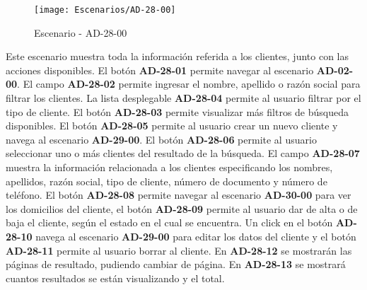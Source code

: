 \begin{figure}[H]
\centering
\texttt{[image: Escenarios/AD-28-00]}
\caption{Escenario - AD-28-00}
\label{fig:AD-28-00}
\end{figure}
Este escenario muestra toda la información referida a los clientes, junto con las acciones disponibles.
El botón \textbf{AD-28-01} permite navegar al escenario \textbf{AD-02-00}. El campo \textbf{AD-28-02} permite ingresar el nombre, apellido o razón social para filtrar los clientes. La lista desplegable \textbf{AD-28-04} permite al usuario filtrar por el tipo de cliente. El botón \textbf{AD-28-03} permite visualizar más filtros de búsqueda disponibles.
El botón \textbf{AD-28-05} permite al usuario crear un nuevo cliente y navega al escenario \textbf{AD-29-00}.
El botón \textbf{AD-28-06} permite al usuario seleccionar uno o más clientes del resultado de la búsqueda. El campo \textbf{AD-28-07} muestra la información relacionada a los clientes  especificando los nombres, apellidos, razón social, tipo de cliente, número de documento y número de teléfono. El botón \textbf{AD-28-08} permite navegar al escenario \textbf{AD-30-00} para ver los domicilios del cliente, el botón \textbf{AD-28-09} permite al usuario dar de alta o de baja el cliente, según el estado en el cual se encuentra. Un click en el botón \textbf{AD-28-10} navega al escenario \textbf{AD-29-00} para editar los datos del cliente y el botón \textbf{AD-28-11} permite al usuario borrar al cliente.
En  \textbf{AD-28-12} se mostrarán las páginas de resultado, pudiendo cambiar de página. En \textbf{AD-28-13} se mostrará cuantos resultados se están visualizando y el total.
\\
